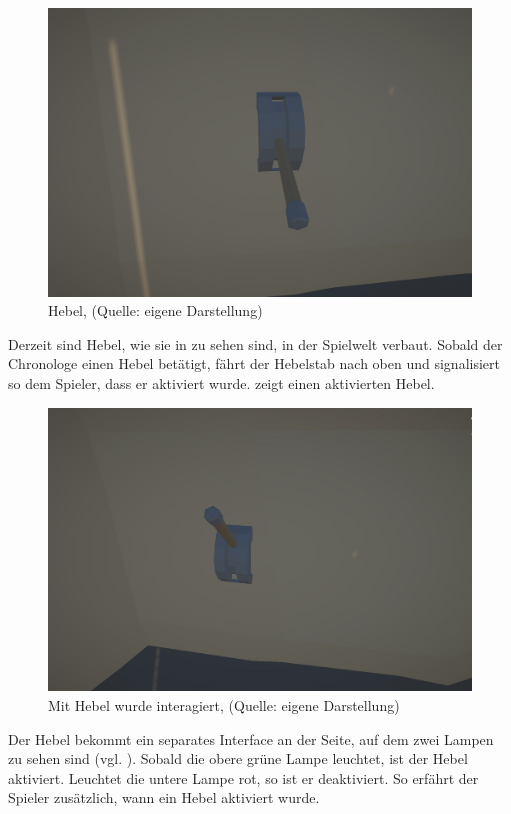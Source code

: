 \begin{figure}[ht]
\centering
\includegraphics[width=0.8\linewidth]{content/pictures/Lever.jpg}
\caption{Hebel, (Quelle: eigene Darstellung)}
\label{fig:lever_interactable}
\end{figure}

Derzeit sind Hebel, wie sie in  zu sehen sind, in der Spielwelt verbaut. Sobald der Chronologe einen Hebel betätigt, fährt der Hebelstab nach oben und signalisiert so dem Spieler, dass er aktiviert wurde.  zeigt einen aktivierten Hebel.

\begin{figure}[ht]
\centering
\includegraphics[width=0.8\linewidth]{content/pictures/Lever_active.jpg}
\caption{Mit Hebel wurde interagiert, (Quelle: eigene Darstellung)}
\label{fig:lever_interactable_active}
\end{figure}

Der Hebel bekommt ein separates Interface an der Seite, auf dem zwei Lampen zu sehen sind (vgl. ). Sobald die obere grüne Lampe leuchtet, ist der Hebel aktiviert. Leuchtet die untere Lampe rot, so ist er deaktiviert. So erfährt der Spieler zusätzlich, wann ein Hebel aktiviert wurde.

